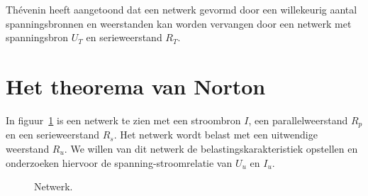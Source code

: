 Th\'evenin heeft aangetoond dat een netwerk gevormd door een willekeurig aantal spanningsbronnen en
weerstanden kan worden vervangen door een netwerk met spanningsbron $U_T$ en serieweerstand $R_T$.


\section{Het theorema van Norton}

In figuur~\ref{fig:gelnetwerkvoornorton} is een netwerk te zien met een stroombron $I$, een
parallelweerstand $R_p$ en een serieweerstand $R_s$. Het netwerk wordt belast met een uitwendige
weerstand $R_u$. We willen van dit netwerk de belastingskarakteristiek opstellen en onderzoeken
hiervoor de spanning-stroomrelatie van $U_u$ en $I_u$.

\begin{figure}[!ht]
\centering
{}
\caption{Netwerk.}
\label{fig:gelnetwerkvoornorton}
\end{figure}

